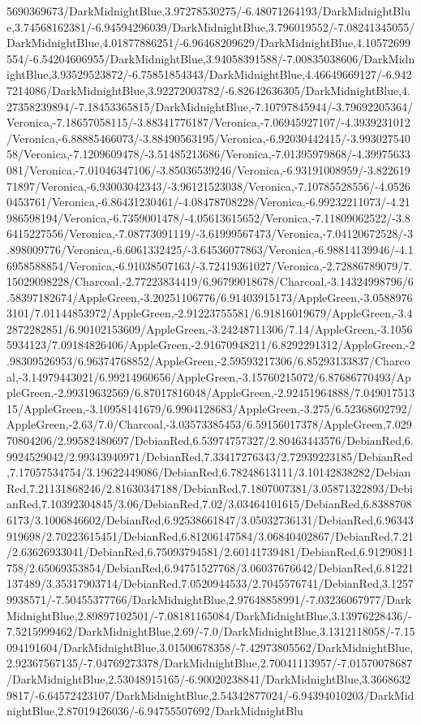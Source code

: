 {\begin{tikzternal}
5690369673/DarkMidnightBlue,3.97278530275/-6.48071264193/DarkMidnightBlue,3.74568162381/-6.94594296039/DarkMidnightBlue,3.796019552/-7.08241345055/DarkMidnightBlue,4.01877886251/-6.96468209629/DarkMidnightBlue,4.10572699554/-6.54204606955/DarkMidnightBlue,3.94058391588/-7.00835038606/DarkMidnightBlue,3.93529523872/-6.75851854343/DarkMidnightBlue,4.46649669127/-6.9427214086/DarkMidnightBlue,3.92272003782/-6.82642636305/DarkMidnightBlue,4.27358239894/-7.18453365815/DarkMidnightBlue,-7.10797845944/-3.79692205364/Veronica,-7.18657058115/-3.88341776187/Veronica,-7.06945927107/-4.3939231012/Veronica,-6.88885466073/-3.88490563195/Veronica,-6.92030442415/-3.99302754058/Veronica,-7.1209609478/-3.51485213686/Veronica,-7.01395979868/-4.39975633081/Veronica,-7.01046347106/-3.85036539246/Veronica,-6.93191008959/-3.82261971897/Veronica,-6.93003042343/-3.96121523038/Veronica,-7.10785528556/-4.05260453761/Veronica,-6.86431230461/-4.08478708228/Veronica,-6.99232211073/-4.21986598194/Veronica,-6.7359001478/-4.05613615652/Veronica,-7.11809062522/-3.86415227556/Veronica,-7.08773091119/-3.61999567473/Veronica,-7.04120672528/-3.898009776/Veronica,-6.6061332425/-3.64536077863/Veronica,-6.98814139946/-4.16958588854/Veronica,-6.91038507163/-3.72419361027/Veronica,-2.72886789079/7.15029098228/Charcoal,-2.77223834419/6.96799018678/Charcoal,-3.14324998796/6.58397182674/AppleGreen,-3.20251106776/6.91403915173/AppleGreen,-3.05889763101/7.01144853972/AppleGreen,-2.91223755581/6.91816019679/AppleGreen,-3.42872282851/6.90102153609/AppleGreen,-3.24248711306/7.14/AppleGreen,-3.10565934123/7.09184826406/AppleGreen,-2.91670948211/6.8292291312/AppleGreen,-2.98309526953/6.96374768852/AppleGreen,-2.59593217306/6.85293133837/Charcoal,-3.14979443021/6.99214960656/AppleGreen,-3.15760215072/6.87686770493/AppleGreen,-2.99319632569/6.87017816048/AppleGreen,-2.92451964888/7.04901751315/AppleGreen,-3.10958141679/6.9904128683/AppleGreen,-3.275/6.52368602792/AppleGreen,-2.63/7.0/Charcoal,-3.03573385453/6.59156017378/AppleGreen,7.02970804206/2.99582480697/DebianRed,6.53974757327/2.80463443576/DebianRed,6.9924529042/2.99343940971/DebianRed,7.33417276343/2.72939223185/DebianRed,7.17057534754/3.19622449086/DebianRed,6.78248613111/3.10142838282/DebianRed,7.21131868246/2.81630347188/DebianRed,7.1807007381/3.05871322893/DebianRed,7.10392304845/3.06/DebianRed,7.02/3.03464101615/DebianRed,6.83887086173/3.1006846602/DebianRed,6.92538661847/3.05032736131/DebianRed,6.96343919698/2.70223615451/DebianRed,6.81206147584/3.06840402867/DebianRed,7.21/2.63626933041/DebianRed,6.75093794581/2.60141739481/DebianRed,6.91290811758/2.65069353854/DebianRed,6.94751527768/3.06037676642/DebianRed,6.81221137489/3.35317903714/DebianRed,7.0520944533/2.7045576741/DebianRed,3.12579938571/-7.50455377766/DarkMidnightBlue,2.97648858991/-7.03236067977/DarkMidnightBlue,2.89897102501/-7.08181165084/DarkMidnightBlue,3.13976228436/-7.5215999462/DarkMidnightBlue,2.69/-7.0/DarkMidnightBlue,3.1312118058/-7.15094191604/DarkMidnightBlue,3.01500678358/-7.42973805562/DarkMidnightBlue,2.92367567135/-7.04769273378/DarkMidnightBlue,2.70041113957/-7.01570078687/DarkMidnightBlue,2.53048915165/-6.90020238841/DarkMidnightBlue,3.36686329817/-6.64572423107/DarkMidnightBlue,2.54342877024/-6.94394010203/DarkMidnightBlue,2.87019426036/-6.94755507692/DarkMidnightBlu
\end{tikzternal}}
